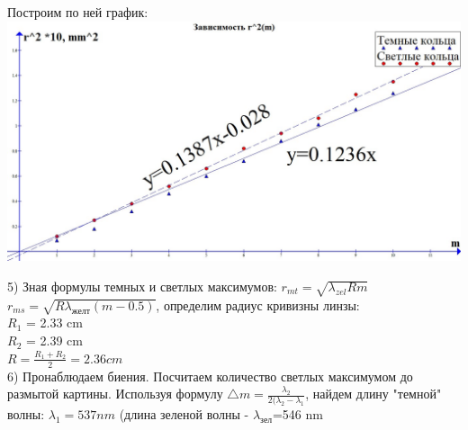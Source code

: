\documentclass[a4paper,12pt]{article} %
\begin{document}
        
 \newpage
Построим по ней график: \\
\includegraphics[scale=0.33]{4211}

5) Зная формулы темных и светлых максимумов: $r_{mt}=\sqrt{\lambda_{zel} R m}    $       $   r_{ms}=\sqrt{R \lambda_{\text{желт}}(m-0.5)} $, определим радиус кривизны линзы:\\
$R_1$ = 2.33 cm\\
$R_2$ = 2.39 cm\\
$R=\frac{R_1+R_2}{2} = 2.36 cm $\\
6) Пронаблюдаем биения. Посчитаем количество светлых максимумом до размытой картины. Используя формулу $\bigtriangleup m =\frac{\lambda_2}{2(\lambda_2-\lambda_1}$, найдем длину "темной" волны: $\lambda_1=537 nm$ (длина зеленой волны - $\lambda_{\text{зел}}$=546 nm
\end{document}
